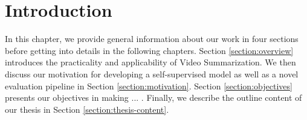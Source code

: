 \chapter{Introduction}
\label{chapter:introduction}

\begin{ChapAbstract}
  In this chapter, we provide general information about our work in four sections before getting into details in the following chapters. Section \ref{section:overview} introduces the practicality and applicability of Video Summarization. We then discuss our motivation for developing a self-supervised model as well as a novel evaluation pipeline in Section \ref{section:motivation}. Section \ref{section:objectives} presents our objectives in making ... . Finally, we describe the outline content of our thesis in Section \ref{section:thesis-content}.
\end{ChapAbstract}




